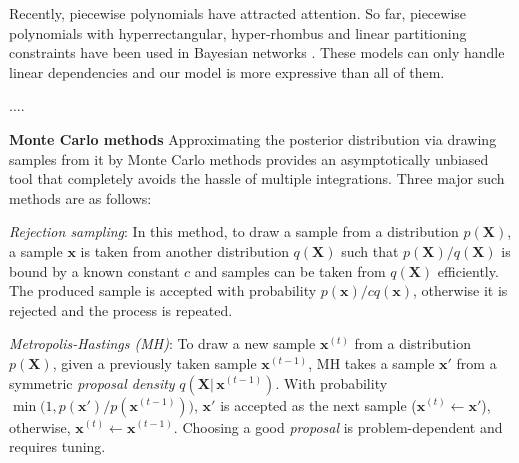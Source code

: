 \documentclass{article}
\newcommand{\bvec}[1]{\textbf{#1}}
\newcommand{\pr}{p}
\begin{document}
{Recently, piecewise polynomials have attracted attention.
So far, piecewise polynomials with hyperrectangular, hyper-rhombus and linear partitioning constraints have been used in Bayesian networks \cite{shenoy2011inference,shenoy2012two,Sanner:12}.
These models can only handle linear dependencies and 
our model is more expressive than all of them. 

....


\textbf{Monte Carlo methods}
Approximating the posterior distribution via drawing samples from it by Monte Carlo methods 
provides an asymptotically unbiased tool that completely avoids the hassle of multiple integrations.%
Three major such methods are as follows:

\emph{Rejection sampling}: In this method, to draw a sample from 
a distribution $p(\bvec{X})$, a sample $\bvec{x}$ is taken from another distribution $q(\bvec{X})$
such that $p(\bvec{X})/q(\bvec{X})$ is bound by a known constant $c$
and samples can be taken from $q(\bvec{X})$ efficiently.
The produced sample is accepted with probability $p(\bvec{x}) / c q(\bvec{x})$, 
otherwise it is rejected and the process is repeated. 

\emph{Metropolis-Hastings (MH)}:
To draw a new sample $\bvec{x}^{(t)}$ from a distribution $p(\bvec{X})$, given a previously taken sample $\bvec{x}^{(t-1)}$, 
MH takes a sample $\bvec{x}'$ from a symmetric \emph{proposal density} $q(\bvec{X} |\, \bvec{x}^{(t-1)})$. 
With probability $\min \big(1, p(\bvec{x}')/p(\bvec{x}^{(t-1)}) \big)$, 
$\bvec{x}'$ is accepted as the next sample ($\bvec{x}^{(t)} \leftarrow \bvec{x}'$), otherwise, $\bvec{x}^{(t)} \leftarrow \bvec{x}^{(t-1)}$. 
Choosing a good \emph{proposal} is problem-dependent and requires tuning. 


}
\end{document}
